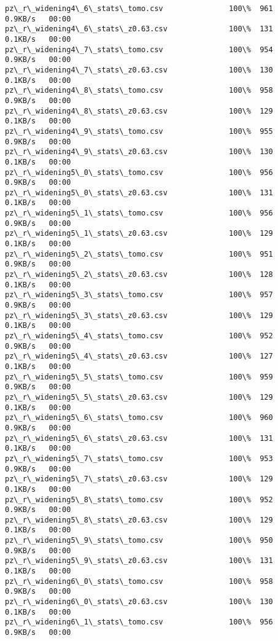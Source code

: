 \documentclass[11pt]{article}
\begin{document}
\begin{Verbatim}[commandchars=\\\{\}]
pz\_r\_widening4\_6\_stats\_tomo.csv               100\%  961     0.9KB/s   00:00    
pz\_r\_widening4\_6\_stats\_z0.63.csv              100\%  131     0.1KB/s   00:00    
pz\_r\_widening4\_7\_stats\_tomo.csv               100\%  954     0.9KB/s   00:00    
pz\_r\_widening4\_7\_stats\_z0.63.csv              100\%  130     0.1KB/s   00:00    
pz\_r\_widening4\_8\_stats\_tomo.csv               100\%  958     0.9KB/s   00:00    
pz\_r\_widening4\_8\_stats\_z0.63.csv              100\%  129     0.1KB/s   00:00    
pz\_r\_widening4\_9\_stats\_tomo.csv               100\%  955     0.9KB/s   00:00    
pz\_r\_widening4\_9\_stats\_z0.63.csv              100\%  130     0.1KB/s   00:00    
pz\_r\_widening5\_0\_stats\_tomo.csv               100\%  956     0.9KB/s   00:00    
pz\_r\_widening5\_0\_stats\_z0.63.csv              100\%  131     0.1KB/s   00:00    
pz\_r\_widening5\_1\_stats\_tomo.csv               100\%  956     0.9KB/s   00:00    
pz\_r\_widening5\_1\_stats\_z0.63.csv              100\%  129     0.1KB/s   00:00    
pz\_r\_widening5\_2\_stats\_tomo.csv               100\%  951     0.9KB/s   00:00    
pz\_r\_widening5\_2\_stats\_z0.63.csv              100\%  128     0.1KB/s   00:00    
pz\_r\_widening5\_3\_stats\_tomo.csv               100\%  957     0.9KB/s   00:00    
pz\_r\_widening5\_3\_stats\_z0.63.csv              100\%  129     0.1KB/s   00:00    
pz\_r\_widening5\_4\_stats\_tomo.csv               100\%  952     0.9KB/s   00:00    
pz\_r\_widening5\_4\_stats\_z0.63.csv              100\%  127     0.1KB/s   00:00    
pz\_r\_widening5\_5\_stats\_tomo.csv               100\%  959     0.9KB/s   00:00    
pz\_r\_widening5\_5\_stats\_z0.63.csv              100\%  129     0.1KB/s   00:00    
pz\_r\_widening5\_6\_stats\_tomo.csv               100\%  960     0.9KB/s   00:00    
pz\_r\_widening5\_6\_stats\_z0.63.csv              100\%  131     0.1KB/s   00:00    
pz\_r\_widening5\_7\_stats\_tomo.csv               100\%  953     0.9KB/s   00:00    
pz\_r\_widening5\_7\_stats\_z0.63.csv              100\%  129     0.1KB/s   00:00    
pz\_r\_widening5\_8\_stats\_tomo.csv               100\%  952     0.9KB/s   00:00    
pz\_r\_widening5\_8\_stats\_z0.63.csv              100\%  129     0.1KB/s   00:00    
pz\_r\_widening5\_9\_stats\_tomo.csv               100\%  950     0.9KB/s   00:00    
pz\_r\_widening5\_9\_stats\_z0.63.csv              100\%  131     0.1KB/s   00:00    
pz\_r\_widening6\_0\_stats\_tomo.csv               100\%  958     0.9KB/s   00:00    
pz\_r\_widening6\_0\_stats\_z0.63.csv              100\%  130     0.1KB/s   00:00    
pz\_r\_widening6\_1\_stats\_tomo.csv               100\%  956     0.9KB/s   00:00    

\end{Verbatim}
\end{document}
